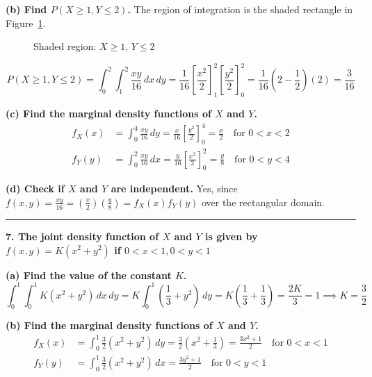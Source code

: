 \documentclass{article}
\begin{document}
\textbf{(b) Find $P(X \ge 1, Y \le 2)$.}
The region of integration is the shaded rectangle in Figure~\ref{fig:6b}.
\begin{figure}[H]
\centering
{}
\caption{Shaded region: $X \ge 1$, $Y \le 2$}
\label{fig:6b}
\end{figure}
$$P(X \ge 1, Y \le 2) = \int_{0}^{2} \int_{1}^{2} \frac{xy}{16} \,dx \,dy = \frac{1}{16} \left[ \frac{x^2}{2} \right]_1^2 \left[ \frac{y^2}{2} \right]_0^2 = \frac{1}{16} \left(2 - \frac{1}{2}\right)(2) = \frac{3}{16}$$

\textbf{(c) Find the marginal density functions of $X$ and $Y$.}
\begin{align*}
f_X(x) &= \int_{0}^{4} \frac{xy}{16} \,dy = \frac{x}{16} \left[ \frac{y^2}{2} \right]_0^4 = \frac{x}{2} \quad \text{for } 0 < x < 2 \\
f_Y(y) &= \int_{0}^{2} \frac{xy}{16} \,dx = \frac{y}{16} \left[ \frac{x^2}{2} \right]_0^2 = \frac{y}{8} \quad \text{for } 0 < y < 4
\end{align*}

\textbf{(d) Check if $X$ and $Y$ are independent.}
Yes, since $f(x,y) = \frac{xy}{16} = \left(\frac{x}{2}\right)\left(\frac{y}{8}\right) = f_X(x)f_Y(y)$ over the rectangular domain.

\vspace{1em}
\hrule
\vspace{1em}

\textbf{7. The joint density function of $X$ and $Y$ is given by $f(x,y) = K(x^2 + y^2)$ if $0 < x < 1, 0 < y < 1$}

\textbf{(a) Find the value of the constant $K$.}
$$\int_{0}^{1} \int_{0}^{1} K(x^2 + y^2) \,dx \,dy = K \int_{0}^{1} \left( \frac{1}{3} + y^2 \right) \,dy = K\left(\frac{1}{3} + \frac{1}{3}\right) = \frac{2K}{3} = 1 \implies K = \frac{3}{2}$$

\textbf{(b) Find the marginal density functions of $X$ and $Y$.}
\begin{align*}
f_X(x) &= \int_{0}^{1} \frac{3}{2}(x^2+y^2) \,dy = \frac{3}{2}\left(x^2 + \frac{1}{3}\right) = \frac{3x^2+1}{2} \quad \text{for } 0 < x < 1 \\
f_Y(y) &= \int_{0}^{1} \frac{3}{2}(x^2+y^2) \,dx = \frac{3y^2+1}{2} \quad \text{for } 0 < y < 1
\end{align*}
\end{document}
